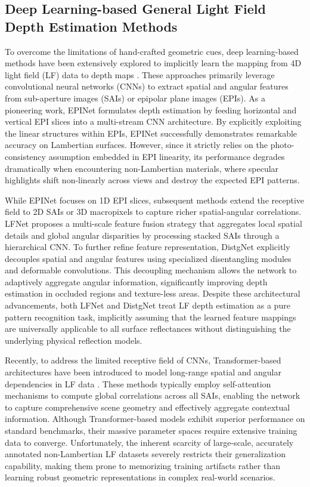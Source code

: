 \subsection{Deep Learning-based General Light Field Depth Estimation Methods}

To overcome the limitations of hand-crafted geometric cues, deep learning-based methods have been extensively explored to implicitly learn the mapping from 4D light field (LF) data to depth maps \cite{deeplearninglightfield4Dd}. These approaches primarily leverage convolutional neural networks (CNNs) to extract spatial and angular features from sub-aperture images (SAIs) or epipolar plane images (EPIs). As a pioneering work, EPINet \cite{EPINetEPICNNdepth} formulates depth estimation by feeding horizontal and vertical EPI slices into a multi-stream CNN architecture. By explicitly exploiting the linear structures within EPIs, EPINet successfully demonstrates remarkable accuracy on Lambertian surfaces. However, since it strictly relies on the photo-consistency assumption embedded in EPI linearity, its performance degrades dramatically when encountering non-Lambertian materials, where specular highlights shift non-linearly across views and destroy the expected EPI patterns.

While EPINet focuses on 1D EPI slices, subsequent methods extend the receptive field to 2D SAIs or 3D macropixels to capture richer spatial-angular correlations. LFNet \cite{LFNetmultiscalelightfield} proposes a multi-scale feature fusion strategy that aggregates local spatial details and global angular disparities by processing stacked SAIs through a hierarchical CNN. To further refine feature representation, DistgNet \cite{DistgNetdisentangledlightfi} explicitly decouples spatial and angular features using specialized disentangling modules and deformable convolutions. This decoupling mechanism allows the network to adaptively aggregate angular information, significantly improving depth estimation in occluded regions and texture-less areas. Despite these architectural advancements, both LFNet and DistgNet treat LF depth estimation as a pure pattern recognition task, implicitly assuming that the learned feature mappings are universally applicable to all surface reflectances without distinguishing the underlying physical reflection models.

Recently, to address the limited receptive field of CNNs, Transformer-based architectures have been introduced to model long-range spatial and angular dependencies in LF data \cite{LFTransformerattentionlight}. These methods typically employ self-attention mechanisms to compute global correlations across all SAIs, enabling the network to capture comprehensive scene geometry and effectively aggregate contextual information. Although Transformer-based models exhibit superior performance on standard benchmarks, their massive parameter spaces require extensive training data to converge. Unfortunately, the inherent scarcity of large-scale, accurately annotated non-Lambertian LF datasets severely restricts their generalization capability, making them prone to memorizing training artifacts rather than learning robust geometric representations in complex real-world scenarios.

